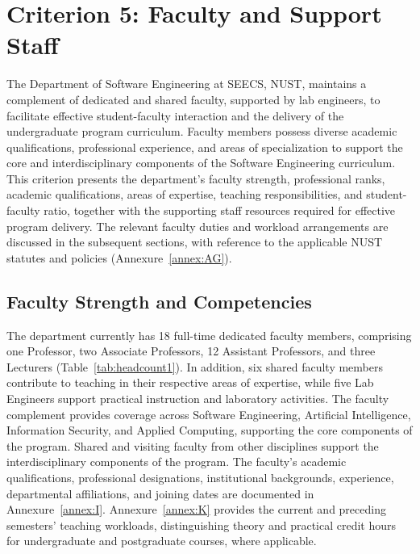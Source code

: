 \providecommand{\real}[1]{#1}


\hypertarget{criterion-5-faculty-and-support-staff}{%
\chapter{Criterion 5: Faculty and Support Staff}\label{criterion-5-faculty-and-support-staff}}

The Department of Software Engineering at SEECS, NUST, maintains a complement of dedicated and shared faculty, supported by lab engineers, to facilitate effective student-faculty interaction and the delivery of the undergraduate program curriculum. Faculty members possess diverse academic qualifications, professional experience, and areas of specialization to support the core and interdisciplinary components of the Software Engineering curriculum. This criterion presents the department's faculty strength, professional ranks, academic qualifications, areas of expertise, teaching responsibilities, and student-faculty ratio, together with the supporting staff resources required for effective program delivery. The relevant faculty duties and workload arrangements are discussed in the subsequent sections, with reference to the applicable NUST statutes and policies (Annexure~\ref{annex:AG}).

\section{Faculty Strength and Competencies}
\label{faculty-strength-and-competencies}

The department currently has 18 full-time dedicated faculty members, comprising one Professor, two Associate Professors, 12 Assistant Professors, and three Lecturers (Table~\ref{tab:headcount1}). In addition, six shared faculty members contribute to teaching in their respective areas of expertise, while five Lab Engineers support practical instruction and laboratory activities. The faculty complement provides coverage across Software Engineering, Artificial Intelligence, Information Security, and Applied Computing, supporting the core components of the program. Shared and visiting faculty from other disciplines support the interdisciplinary components of the program. The faculty's academic qualifications, professional designations, institutional backgrounds, experience, departmental affiliations, and joining dates are documented in Annexure~\ref{annex:I}. Annexure~\ref{annex:K} provides the current and preceding semesters' teaching workloads, distinguishing theory and practical credit hours for undergraduate and postgraduate courses, where applicable. %

